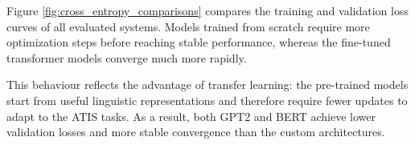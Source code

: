Figure \ref{fig:cross_entropy_comparisons} compares the training and validation loss curves of all evaluated systems. Models trained from scratch require more optimization steps before reaching stable performance, whereas the fine-tuned transformer models converge much more rapidly.

This behaviour reflects the advantage of transfer learning: the pre-trained models start from useful linguistic representations and therefore require fewer updates to adapt to the ATIS tasks. As a result, both GPT2 and BERT achieve lower validation losses and more stable convergence than the custom architectures.
